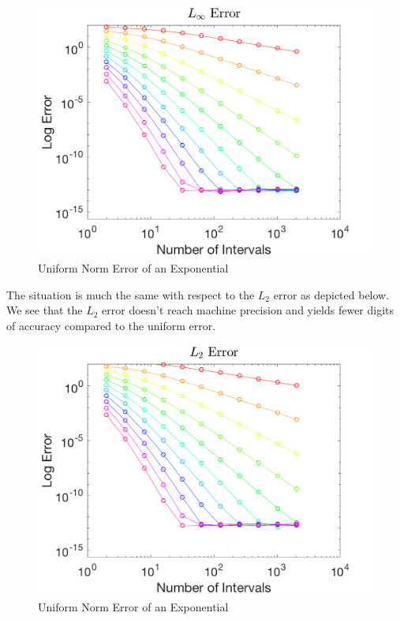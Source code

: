 \documentclass{article}
\begin{document}
\begin{figure}[H]
  \centering
  \includegraphics[width=\textwidth]{maxError_0.png}
  \caption{Uniform Norm Error of an Exponential}
  \label{fig:maxErr0}
\end{figure}

\noindent The situation is much the same with respect to the $L_2$ error as depicted below. We see that the $L_2$ error doesn't reach machine precision and yields fewer digits of accuracy compared to the uniform error. 

\begin{figure}[H]
  \centering
  \includegraphics[width=\textwidth]{squareError_0.png}
  \caption{Uniform Norm Error of an Exponential}
  \label{fig:maxErr0}
\end{figure}
\end{document}
